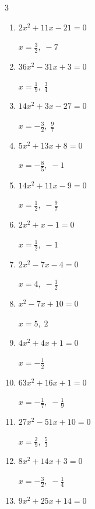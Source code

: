 \begin{multicols}{3}
\begin{enumerate}
  \itemsep=30pt
  \item $2x^{2}+11x-21=0$

        $\displaystyle x=\frac{3}{2},\; -7$

  \item $36x^{2}-31x+3=0$

        $\displaystyle x=\frac{1}{9},\; \frac{3}{4}$

  \item $14x^{2}+3x-27=0$

        $\displaystyle x=-\frac{3}{2},\; \frac{9}{7}$

  \item $5x^{2}+13x+8=0$

        $\displaystyle x=-\frac{8}{5},\; -1$

  \item $14x^{2}+11x-9=0$

        $\displaystyle x=\frac{1}{2},\; -\frac{9}{7}$

  \item $2x^{2}+x-1=0$

        $\displaystyle x=\frac{1}{2},\; -1$

  \item $2x^{2}-7x-4=0$

        $\displaystyle x=4,\; -\frac{1}{2}$

  \item $x^{2}-7x+10=0$

        $\displaystyle x=5,\; 2$

  \item $4x^{2}+4x+1=0$

        $\displaystyle x=-\frac{1}{2}$

  \item $63x^{2}+16x+1=0$

        $\displaystyle x=-\frac{1}{7},\; -\frac{1}{9}$

\columnbreak %

  \item $27x^{2}-51x+10=0$

        $\displaystyle x=\frac{2}{9},\; \frac{5}{3}$

  \item $8x^{2}+14x+3=0$

        $\displaystyle x=-\frac{3}{2},\; -\frac{1}{4}$

  \item $9x^{2}+25x+14=0$


\end{enumerate}
\end{multicols}
